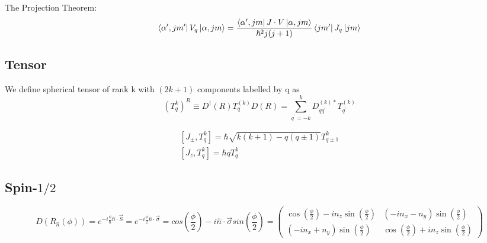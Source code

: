 The Projection Theorem:
\begin{equation}
    \bra{\alpha',jm'}V_q\ket{\alpha,jm} = \frac{\bra{\alpha',jm}J\cdot V\ket{\alpha,jm}}{\hbar^2j(j+1)}\bra{jm'}J_q\ket{jm}
\end{equation}



\subsection{Tensor}
We define spherical tensor of rank k with $(2k+1)$ components labelled by q
as
\begin{equation}
    (T^k_q)^R \equiv D^{\dag}(R)T^{(k)}_{q}D(R)=\displaystyle\sum_{q^\prime=-k}^{k}D^{(k)*}_{qq^\prime}T^{(k)}_{q^\prime}
\end{equation}

\begin{equation}
    \begin{gathered}
	[J_{\pm}, T^k_q] = \hbar\sqrt{k(k+1) -q(q\pm 1)}T^k_{q\pm 1}    \\
	[J_z, T^k_q] = \hbar qT^k_q
    \end{gathered}
\end{equation}
\subsection{Spin-$1/2$} 
\[ 
D(R_{\hat{n}}(\phi)) = e^{-i\frac{\phi}{\hbar}\hat{n}\cdot\vec{S}} = e^{-i\frac{\phi}{2}\hat{n}\cdot\vec{\sigma}} = 
cos(\frac{\phi}{2}) - i \hat{n} \cdot \vec{\sigma} sin(\frac{\phi}{2}) = 
\begin{pmatrix}
    \cos(\frac{\phi}{2}) - in_{z}\sin(\frac{\phi}{2}) & (-i n_{x} - n_{y})\sin(\frac{\phi}{2}) \\ 
    (-i n_{x} + n_{y})\sin(\frac{\phi}{2}) &  \cos(\frac{\phi}{2}) + in_{z}\sin(\frac{\phi}{2})  
\end{pmatrix}
\]

